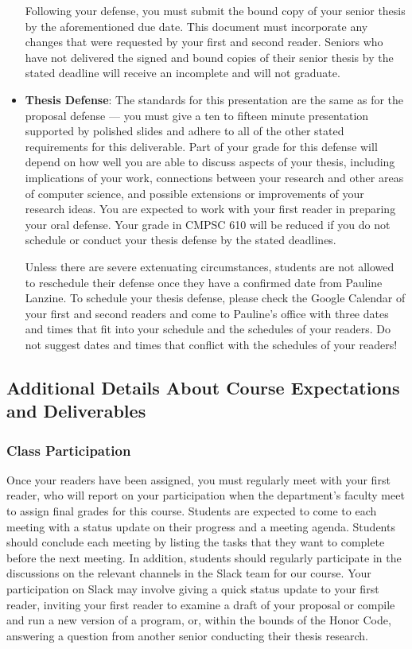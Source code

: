 \documentclass[11pt]{article}
\begin{document}
\begin{itemize}
    Following your defense, you must submit the bound copy of your senior
    thesis by the aforementioned due date.  This document must incorporate any
    changes that were requested by your first and second reader. Seniors who
    have not delivered the signed and bound copies of their senior thesis by
    the stated deadline will receive an incomplete and will not graduate.

  \item{\bf Thesis Defense}: The standards for this presentation are the same
    as for the proposal defense --- you must give a ten to fifteen minute
    presentation supported by polished slides and adhere to all of the other
    stated requirements for this deliverable. Part of your grade for this
    defense will depend on how well you are able to discuss aspects of your
    thesis, including implications of your work, connections between your
    research and other areas of computer science, and possible extensions or
    improvements of your research ideas. You are expected to work with your
    first reader in preparing your oral defense. Your grade in CMPSC 610 will
    be reduced if you do not schedule or conduct your thesis defense by the
    stated deadlines.

    Unless there are severe extenuating circumstances, students are not allowed
    to reschedule their defense once they have a confirmed date from Pauline
    Lanzine. To schedule your thesis defense, please check the Google Calendar
    of your first and second readers and come to Pauline's office with three
    dates and times that fit into your schedule and the schedules of your
    readers. Do not suggest dates and times that conflict with the schedules of
    your readers!

\end{itemize}

\subsection*{Additional Details About Course Expectations and Deliverables}

\subsubsection*{Class Participation}

Once your readers have been assigned, you must regularly meet with your first
reader, who will report on your participation when the department's faculty
meet to assign final grades for this course. Students are expected to come to
each meeting with a status update on their progress and a meeting agenda.
Students should conclude each meeting by listing the tasks that they want to
complete before the next meeting. In addition, students should regularly
participate in the discussions on the relevant channels in the Slack team for
our course. Your participation on Slack may involve giving a quick status
update to your first reader, inviting your first reader to examine a draft of
your proposal or compile and run a new version of a program, or, within the
bounds of the Honor Code, answering a question from another senior conducting
their thesis research.
\end{document}
